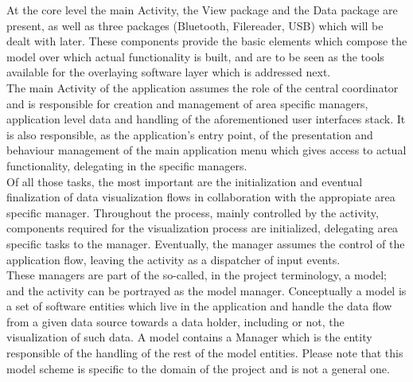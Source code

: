 		At the core level the main Activity, the View package and the Data package are present, as well as three packages (Bluetooth, Filereader, USB) which will be dealt with later. These components provide the basic elements which compose the model over which actual functionality is built, and are to be seen as the tools available for the overlaying software layer which is addressed next.\\

		The main Activity of the application assumes the role of the central coordinator and is responsible for creation and management of area specific managers, application level data and handling of the aforementioned user interfaces stack. It is also responsible, as the application's entry point, of the presentation and behaviour management of the main application menu which gives access to actual functionality, delegating in the specific managers.\\
		
		Of all those tasks, the most important are the initialization and eventual finalization of data visualization flows in collaboration with the appropiate area specific manager. Throughout the process, mainly controlled by the activity, components required for the visualization process are initialized, delegating area specific tasks to the manager. Eventually, the manager assumes the control of the application flow, leaving the activity as a dispatcher of input events.\\


		These managers are part of the so-called, in the project terminology, a model; and the activity can be portrayed as the model manager. Conceptually a model is a set of software entities which live in the application and handle the data flow from a given data source towards a data holder, including or not, the visualization of such data. A model contains a Manager which is the entity responsible of the handling of the rest of the model entities. Please note that this model scheme is  specific to the domain of the project and is not a general one.

